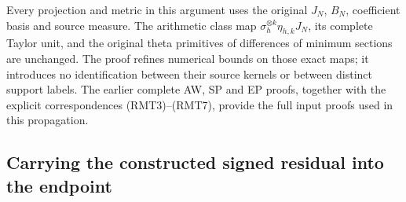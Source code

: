 Every projection and metric in this argument uses the
original \(J_N\), \(B_N\), coefficient basis and source
measure.  The arithmetic class map
\(\sigma_h^{\otimes k}\eta_{h,k}J_N\), its complete Taylor
unit, and the original theta primitives of differences of
minimum sections are unchanged.  The proof refines numerical
bounds on those exact maps; it introduces no identification
between their source kernels or between distinct support
labels.  The earlier complete AW, SP and EP proofs, together
with the explicit correspondences (RMT3)--(RMT7), provide
the full input proofs used in this propagation.

\subsection{Carrying the constructed signed residual into the endpoint}


